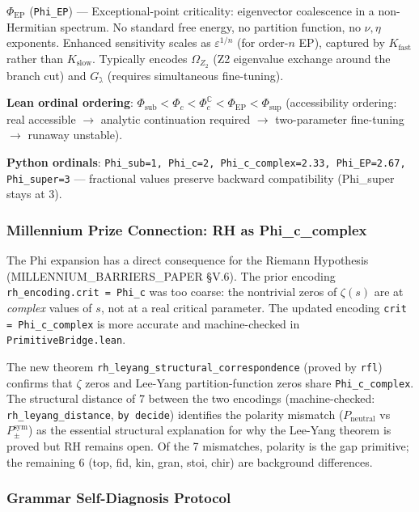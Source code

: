 \documentclass[12pt,a4paper]{article}
\newcommand{\pilcrow}{\S}
\begin{document}
\textbf{$\Phi_\text{EP}$} (\texttt{Phi\_EP}) --- Exceptional-point criticality: eigenvector coalescence in a non-Hermitian spectrum. No standard free energy, no partition function, no $\nu,\eta$ exponents. Enhanced sensitivity scales as $\varepsilon^{1/n}$ (for order-$n$ EP), captured by $K_\text{fast}$ rather than $K_\text{slow}$. Typically encodes $\Omega_{Z_2}$ (Z2 eigenvalue exchange around the branch cut) and $G_{\gimel}$ (requires simultaneous fine-tuning).

\textbf{Lean ordinal ordering}: $\Phi_\text{sub} < \Phi_c < \Phi_c^\mathbb{C} < \Phi_\text{EP} < \Phi_\text{sup}$ (accessibility ordering: real accessible $\rightarrow$ analytic continuation required $\rightarrow$ two-parameter fine-tuning $\rightarrow$ runaway unstable).

\textbf{Python ordinals}: \texttt{Phi\_sub=1, Phi\_c=2, Phi\_c\_complex=2.33, Phi\_EP=2.67, Phi\_super=3} --- fractional values preserve backward compatibility (Phi\_super stays at 3).

\subsubsection{Millennium Prize Connection: RH as Phi\_c\_complex}

The Phi expansion has a direct consequence for the Riemann Hypothesis (MILLENNIUM\_BARRIERS\_PAPER \pilcrow{}V.6). The prior encoding \texttt{rh\_encoding.crit = Phi\_c} was too coarse: the nontrivial zeros of $\zeta(s)$ are at \emph{complex} values of $s$, not at a real critical parameter. The updated encoding \texttt{crit = Phi\_c\_complex} is more accurate and machine-checked in \texttt{PrimitiveBridge.lean}.

The new theorem \texttt{rh\_leyang\_structural\_correspondence} (proved by \texttt{rfl}) confirms that $\zeta$ zeros and Lee-Yang partition-function zeros share \texttt{Phi\_c\_complex}. The structural distance of 7 between the two encodings (machine-checked: \texttt{rh\_leyang\_distance}, \texttt{by decide}) identifies the polarity mismatch ($P_\text{neutral}$ vs $P_{\pm}^{\text{sym}}$) as the essential structural explanation for why the Lee-Yang theorem is proved but RH remains open. Of the 7 mismatches, polarity is the gap primitive; the remaining 6 (top, fid, kin, gran, stoi, chir) are background differences.

\subsubsection{Grammar Self-Diagnosis Protocol}
\end{document}
